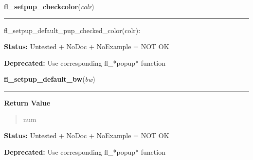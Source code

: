     \vspace{0.5ex}

\hspace{.8\funcindent}\begin{boxedminipage}{\funcwidth}

    \raggedright \textbf{fl\_setpup\_checkcolor}(\textit{colr})

    \vspace{-1.5ex}

    \rule{\textwidth}{0.5\fboxrule}
\setlength{\parskip}{2ex}
    fl\_setpup\_default\_pup\_checked\_color(colr):

\setlength{\parskip}{1ex}
\textbf{Status:} Untested + NoDoc + NoExample = NOT OK



\textbf{Deprecated:} Use corresponding fl\_*popup* function



    \end{boxedminipage}

    \label{xformslib:library:fl_setpup_default_bw}

    \vspace{0.5ex}

\hspace{.8\funcindent}\begin{boxedminipage}{\funcwidth}

    \raggedright \textbf{fl\_setpup\_default\_bw}(\textit{bw})

    \vspace{-1.5ex}

    \rule{\textwidth}{0.5\fboxrule}
\setlength{\parskip}{2ex}
\setlength{\parskip}{1ex}
      \textbf{Return Value}
    \vspace{-1ex}

      \begin{quote}
      num

      \end{quote}

\textbf{Status:} Untested + NoDoc + NoExample = NOT OK



\textbf{Deprecated:} Use corresponding fl\_*popup* function



    \end{boxedminipage}

    \label{xformslib:library:fl_setpup_shortcut}

